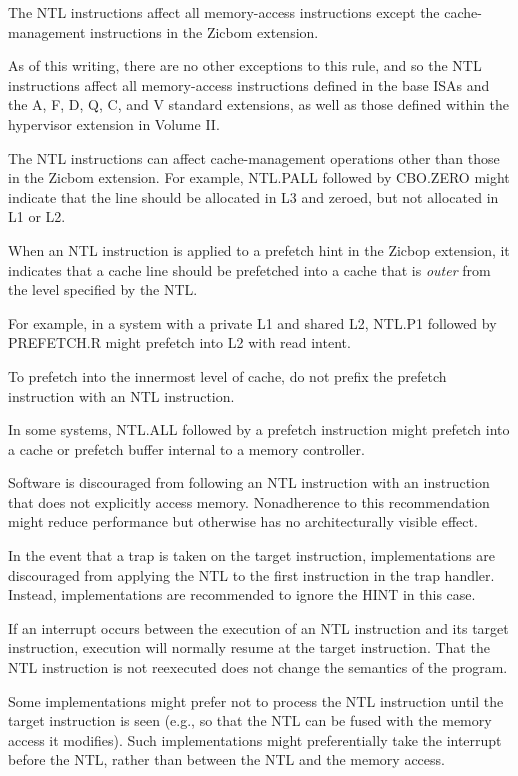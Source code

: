 The NTL instructions affect all memory-access instructions except the
cache-management instructions in the Zicbom extension.

\begin{commentary}
As of this writing, there are no other exceptions to this rule, and so
the NTL instructions affect all memory-access instructions
defined in the base ISAs and the A, F, D, Q, C, and V standard extensions,
as well as those defined within the hypervisor extension in Volume II.

The NTL instructions can affect cache-management operations other than those
in the Zicbom extension.
For example, NTL.PALL followed by CBO.ZERO might indicate
that the line should be allocated in L3 and zeroed, but not allocated in
L1 or L2.
\end{commentary}

When an NTL instruction is applied to a prefetch hint in the Zicbop extension,
it indicates that a cache line should be prefetched into a cache that is
{\em outer} from the level specified by the NTL.

\begin{commentary}
For example, in a system with a private L1 and shared L2, NTL.P1 followed by
PREFETCH.R might prefetch into L2 with read intent.

To prefetch into the innermost level of cache, do not prefix the prefetch
instruction with an NTL instruction.

In some systems, NTL.ALL followed by a prefetch instruction might prefetch
into a cache or prefetch buffer internal to a memory controller.
\end{commentary}

Software is discouraged from following an NTL instruction with an
instruction that does not explicitly access memory.
Nonadherence to this recommendation might reduce performance but
otherwise has no architecturally visible effect.

In the event that a trap is taken on the target instruction,
implementations are discouraged from applying the NTL to the first instruction
in the trap handler.
Instead, implementations are recommended to ignore the HINT in this case.

\begin{commentary}
If an interrupt occurs between the execution of an NTL instruction and its
target instruction, execution will normally resume at the
target instruction.
That the NTL instruction is not reexecuted does not change the semantics of
the program.

Some implementations might prefer not to process the NTL instruction until the
target instruction is seen (e.g., so that the NTL can be
fused with the memory access it modifies).
Such implementations might preferentially take the interrupt before the NTL,
rather than between the NTL and the memory access.
\end{commentary}

